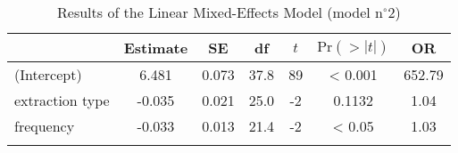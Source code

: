 \begin{table}
\begin{tabular}{l S[table-format=-1.3] S[table-format=1.3] S[table-format=2.1] S[table-format=-1] S[table-format=<1.4] S[table-format=3.2] }
  \lsptoprule
 & {Estimate} & {SE} & {df} & {$t$} & {$\text{Pr}(>|t|)$} & {OR} \\ 
  \midrule
(Intercept) & 6.481 & 0.073 & 37.8 & 89 & < 0.001 & 652.79 \\ 
  extraction type & -0.035 & 0.021 & 25.0 & -2 & 0.1132 & 1.04 \\ 
  frequency & -0.033 & 0.013 & 21.4 & -2 & < 0.05 & 1.03 \\ 
   \lspbottomrule
\end{tabular}
\caption{Results of the Linear Mixed-Effects Model (model n$^{\circ}$2)}
\label{tab:exp09-m2}
\end{table}
